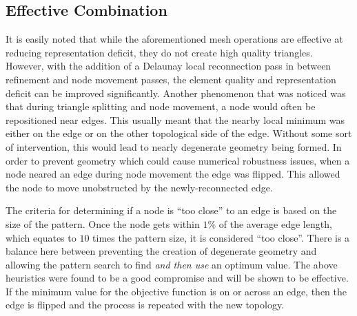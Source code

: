\subsection{Effective Combination}
It is easily noted that while the aforementioned mesh operations are
effective at reducing representation deficit, they do not create high
quality triangles. However, with the addition of a Delaunay local
reconnection pass in between refinement and node movement passes, the
element quality and representation deficit can be improved
significantly.  Another phenomenon that was noticed was that during
triangle splitting and node movement, a node would often be repositioned
near edges. This usually meant that the nearby local minimum was either
on the edge or on the other topological side of the edge. Without some
sort of intervention, this would lead to nearly degenerate geometry
being formed. In order to prevent geometry which could cause numerical
robustness issues, when a node neared an edge during node movement the
edge was flipped. This allowed the node to move unobstructed by the
newly-reconnected edge.

The criteria for determining if a node is ``too close'' to an edge is
based on the size of the pattern. Once the node gets within $1\%$ of the
average edge length, which equates to $10$ times the pattern size, it is
considered ``too close''. There is a balance here between preventing the
creation of degenerate geometry and allowing the pattern search to find
{\it and then use} an optimum value. The above heuristics were found to
be a good compromise and will be shown to be effective. If the minimum
value for the objective function is on or across an edge, then the edge
is flipped and the process is repeated with the new topology.

